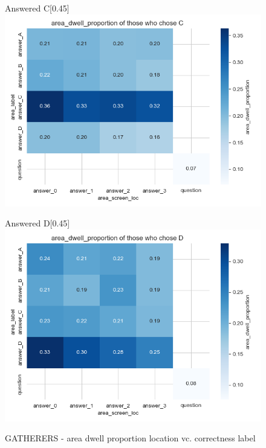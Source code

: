 \documentclass{article}
\begin{document}
\begin{figure}[H]
  \vspace{1em} %

  \begin{subcaptionbox}{Answered C\label{fig:C_dp_g}}[0.45\textwidth]
    {\centering\includegraphics[width=\linewidth]{plots/matrix_plots/matrix_area_dwell_proportion_C_gatherers.png}}
  \end{subcaptionbox}
  \hfill
  \begin{subcaptionbox}{Answered D\label{fig:D_dp_g}}[0.45\textwidth]
    {\centering\includegraphics[width=\linewidth]{plots/matrix_plots/matrix_area_dwell_proportion_D_gatherers.png}}
  \end{subcaptionbox}
  
  \caption{GATHERERS - area dwell proportion location vc. correctness label}
  \label{fig:fourimages2}
\end{figure}
\end{document}
